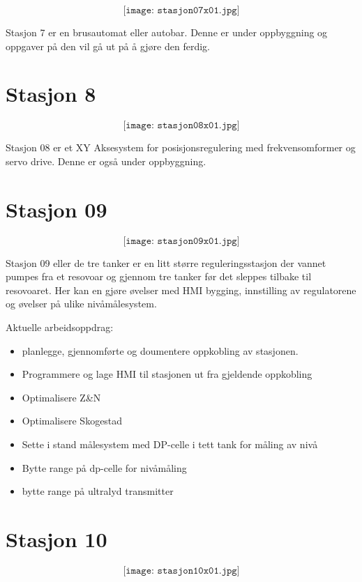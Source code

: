 $$\texttt{[image: stasjon07x01.jpg]}$$

Stasjon 7 er en brusautomat eller autobar. Denne er under oppbyggning og oppgaver på den vil gå ut på å gjøre den ferdig. 




\section{Stasjon 8}

$$\texttt{[image: stasjon08x01.jpg]}$$

Stasjon 08 er et XY Aksesystem  for posisjonsregulering med frekvensomformer og servo drive. Denne er også under oppbyggning. 

\section{Stasjon 09}

$$\texttt{[image: stasjon09x01.jpg]}$$

Stasjon 09 eller de tre tanker er en litt større reguleringsstasjon der vannet pumpes fra  et resovoar og gjennom tre tanker før det sleppes tilbake til resovoaret. Her kan en gjøre øvelser med HMI bygging, innstilling av regulatorene og øvelser på ulike nivåmålesystem. 

Aktuelle arbeidsoppdrag:\\
\begin{itemize}[noitemsep]
	\item planlegge, gjennomførte og doumentere oppkobling av stasjonen.
	\item Programmere og lage HMI til stasjonen ut fra gjeldende oppkobling
	\item Optimalisere Z\&N
	\item Optimalisere Skogestad
	\item Sette i stand målesystem med DP-celle i tett tank for måling av nivå
	\item Bytte range på dp-celle for nivåmåling
	\item bytte range på ultralyd transmitter
\end{itemize}


\section{Stasjon 10}

$$\texttt{[image: stasjon10x01.jpg]}$$

